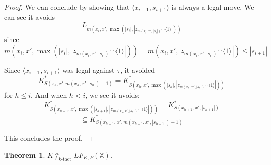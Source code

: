 \documentclass[11pt]{article}
\theoremstyle{plain}
\newtheorem{theorem}{Theorem}
\theoremstyle{definition}
\theoremstyle{remark}
\newcommand{\ktactwin}[1]{\uparrow_{#1\text{-tact}}}
\newcommand{\lfkpgame}[1]{LF_{K,P}(#1)}
\newcommand{\<}{\langle}
\renewcommand{\>}{\rangle}
\begin{document}
\begin{proof}
We can conclude by showing that $\<x_{i+1},s_{i+1}\>$ is always a legal move. We can see it avoids 
  \[
  L_{m(x_{i},x',\max(|s_{i}|,|{z_{m(x_i,x',|s_i|)}}^\frown\<1\>|))}
  \]
since
  \[
    m(x_{i},x',\max(|s_{i}|,|{z_{m(x_i,x',|s_i|)}}^\frown\<1\>|)) =
    m(x_{i},x',|{z_{m(x_i,x',|s_i|)}}^\frown\<1\>|) \leq
    |s_{i+1}|
  \]

Since $\<x_{i+1},s_{i+1}\>$ was legal against $\tau$, it avoided
  \[
    K^*_{S(x_h,x',m(x_h,x',|s_h|)+1)} = 
    K^*_{S(x_h,x',\max(|s_h|,|{z_{m(x_h,x',|s_h|)}}^\frown\<1\>|))}
  \]
for $h\leq i$. And when $h<i$, we see it avoids:
  \[
    K^*_{S(x_{h+1},x',\max(|s_{h+1}|,|{z_{m(x_h,x',|s_h|)}}^\frown\<1\>|))} =
    K^*_{S(x_{h+1},x',|s_{h+1}|)}
  \]
  \[
    \subseteq
    K^*_{S(x_{h+1},x',m(x_{h+1},x',|s_{h+1}|)+1)}
  \]

This concludes the proof.
\end{proof}

\begin{theorem}
$K\not\ktactwin{k}\lfkpgame{\mathbb{X}}$.
\end{theorem}
\end{document}
